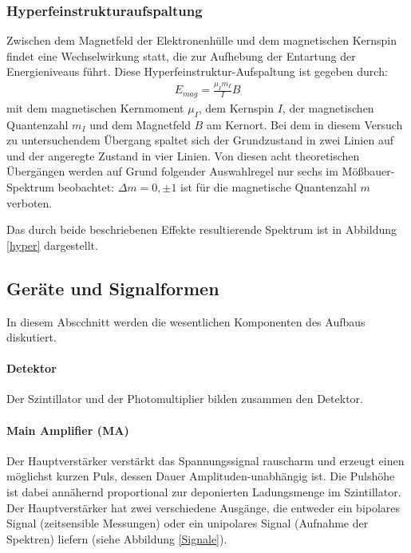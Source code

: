 \subsubsection{Hyperfeinstrukturaufspaltung}

Zwischen dem Magnetfeld der Elektronenhülle und dem magnetischen Kernspin findet eine Wechselwirkung statt, die zur Aufhebung der Entartung der Energieniveaus führt. Diese Hyperfeinstruktur-Aufspaltung 
ist gegeben durch:
\begin{align}
E_{mag} = \frac{\mu_I m_I}{I}B
\end{align}
mit dem magnetischen Kernmoment $\mu_I$, dem Kernspin $I$, der magnetischen Quantenzahl $m_I$ und dem Magnetfeld $B$ am Kernort.
Bei dem in diesem Versuch zu untersuchendem Übergang spaltet sich der Grundzustand in zwei Linien auf und der angeregte Zustand in vier Linien. Von diesen acht theoretischen Übergängen werden auf Grund folgender Auswahlregel nur sechs im Mößbauer-Spektrum beobachtet: $\Delta m =0, \pm 1$ ist für die magnetische Quantenzahl $m$ verboten.

Das durch beide beschriebenen Effekte resultierende Spektrum ist in Abbildung \ref{hyper} dargestellt.



\subsection{Geräte und Signalformen}
In diesem Abscchnitt werden die wesentlichen Komponenten des Aufbaus diskutiert.\cite{szinti}
\paragraph{Detektor} Der Szintillator und der Photomultiplier bilden zusammen den Detektor.
\paragraph{Main Amplifier (MA)}
Der Hauptverstärker  verstärkt das Spannungssignal rauscharm und erzeugt einen möglichst kurzen Puls, dessen Dauer Amplituden-unabhängig ist. Die Pulshöhe ist dabei annähernd proportional zur deponierten Ladungsmenge im Szintillator. Der Hauptverstärker hat zwei verschiedene Ausgänge, die entweder ein bipolares Signal (zeitsensible Messungen) oder ein unipolares Signal (Aufnahme der Spektren) liefern (siehe Abbildung \ref{Signale}).
